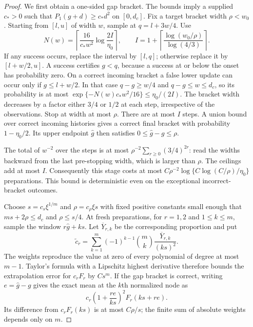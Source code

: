 \begin{proof}
We first obtain a one-sided gap bracket. The bounds imply a supplied
$c_*>0$ such that $P_1(g+d)\ge c_*d^2$ on $[0,d_c]$.
Fix a target bracket width $\rho<w_0$. Starting from $[l,u]$ of
width $w$, sample at $q=l+3w/4$. Use
\[
 N(w)=\left\lceil\frac{16}{c_*w^2}
                         \log\frac{2I}{\eta_0}\right\rceil,
 \qquad I=1+\left\lceil
                     \frac{\log(w_0/\rho)}{\log(4/3)}\right\rceil.
\]
If any success occurs, replace the interval by $[l,q]$; otherwise
replace it by $[l+w/2,u]$. A success certifies $g<q$, because a
success at or below the onset has probability zero. On a correct
incoming bracket a false lower update can occur only if
$g\le l+w/2$. In that case $q-g\ge w/4$ and $q-g\le w\le d_c$,
so its probability is at most
$\exp\{-N(w)c_*w^2/16\}\le\eta_0/(2I)$.
The bracket width decreases by a factor either $3/4$ or $1/2$ at
each step, irrespective of the observations. Stop at width at most
$\rho$. There are at most $I$ steps. A union bound over correct
incoming histories gives a correct final bracket with probability
$1-\eta_0/2$. Its upper endpoint $\widehat g$ then satisfies
$0\le\widehat g-g\le\rho$.

The total of $w^{-2}$ over the steps is at most
$\rho^{-2}\sum_{r\ge0}(3/4)^{2r}$: read the widths backward
from the last pre-stopping width, which is larger than $\rho$.
The ceilings add at most $I$. Consequently this stage costs at most
$C\rho^{-2}\log\{C\log(C/\rho)/\eta_0\}$ preparations.
This bound is deterministic even on the exceptional incorrect-bracket
outcomes.

Choose $s=c_s\xi^{1/m}$ and $\rho=c_\rho\xi s$ with fixed
positive constants small enough that $ms+2\rho\le d_c$ and
$\rho\le s/4$. At fresh preparations, for $r=1,2$ and
$1\le k\le m$, sample the window $r\widehat g+ks$. Let
$\overline Y_{r,k}$ be the corresponding proportion and put
\begin{equation}\label{eq:v11-calibration-extrapolation}
 \widetilde c_r=
   \sum_{k=1}^m(-1)^{k-1}\binom mk
                         \frac{\overline Y_{r,k}}{(ks)^2}.
\end{equation}
The weights reproduce the value at zero of every polynomial of degree
at most $m-1$. Taylor's formula with a Lipschitz highest derivative
therefore bounds the extrapolation error for $c_rF_r$ by $Cs^m$.
If the gap bracket is correct, writing $e=\widehat g-g$ gives the
exact mean at the $k$th normalized node as
\[
 c_r\left(1+\frac{re}{ks}\right)^2F_r(ks+re).
\]
Its difference from $c_rF_r(ks)$ is at most $C\rho/s$;
the finite sum of absolute weights depends only on $m$.


\end{proof}
